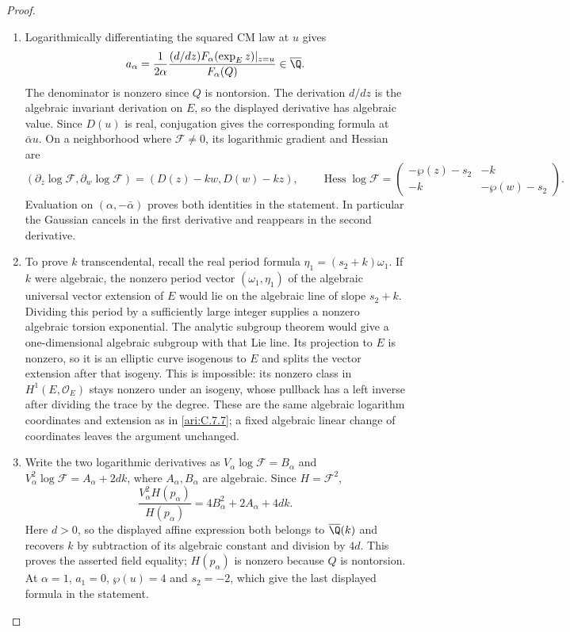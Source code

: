 \begin{proof}
\begin{enumerate}[label=\arabic*.,leftmargin=*]
\item Logarithmically differentiating the squared CM law at $u$
gives
\[
 a_\alpha=\frac{1}{2\alpha}
     \frac{(d/dz)F_\alpha(\exp_Ez)|_{z=u}}{F_\alpha(Q)}
                  \in\overline{\Q}.
\]
The denominator is nonzero since $Q$ is nontorsion. The
derivation $d/dz$ is the algebraic invariant derivation on
$E$, so the displayed derivative has algebraic value.
Since $D(u)$ is real, conjugation gives the corresponding
formula at $\bar\alpha u$. On a neighborhood where
$\mathcal F\ne0$, its logarithmic gradient and Hessian are
\[
 (\partial_z\log\mathcal F,\partial_w\log\mathcal F)
       =(D(z)-kw,D(w)-kz),\qquad
 \operatorname{Hess}\log\mathcal F=
 \begin{pmatrix}-\wp(z)-s_2&-k\\-k&-\wp(w)-s_2\end{pmatrix}.
\]
Evaluation on $(\alpha,-\bar\alpha)$ proves both identities
in the statement. In particular the Gaussian cancels in the
first derivative and reappears in the second derivative.

\item To prove $k$ transcendental, recall the real period formula
$\eta_1=(s_2+k)\omega_1$. If $k$ were algebraic, the
nonzero period vector $(\omega_1,\eta_1)$ of the algebraic
universal vector extension of $E$ would lie on the algebraic
line of slope $s_2+k$. Dividing this period by a sufficiently
large integer supplies a nonzero algebraic torsion exponential.
The analytic subgroup theorem
\citep[Theorem 6.1]{huber2022} would give a one-dimensional
algebraic subgroup with that Lie line. Its projection to $E$
is nonzero, so it is an elliptic curve isogenous to $E$ and
splits the vector extension after that isogeny. This is
impossible: its nonzero class in $H^1(E,\mathcal O_E)$ stays
nonzero under an isogeny, whose pullback has a left inverse
after dividing the trace by the degree. These are the same
algebraic logarithm coordinates and extension as in \ref{ari:C.7.7};
a fixed algebraic linear change of coordinates leaves the
argument unchanged.

\item Write the two logarithmic derivatives as
$V_\alpha\log\mathcal F=B_\alpha$ and
$V_\alpha^2\log\mathcal F=A_\alpha+2dk$, where
$A_\alpha,B_\alpha$ are algebraic. Since $H=\mathcal F^2$,
\[
 \frac{V_\alpha^2H(p_\alpha)}{H(p_\alpha)}
       =4B_\alpha^2+2A_\alpha+4dk.
\]
Here $d>0$, so the displayed affine expression both belongs to
$\overline\Q(k)$ and recovers $k$ by subtraction of its algebraic
constant and division by $4d$. This proves the asserted field
equality; $H(p_\alpha)$ is nonzero because $Q$ is nontorsion.
At $\alpha=1$, $a_1=0$, $\wp(u)=4$ and $s_2=-2$,
which give the last displayed formula in the statement.


\end{enumerate}
\end{proof}

